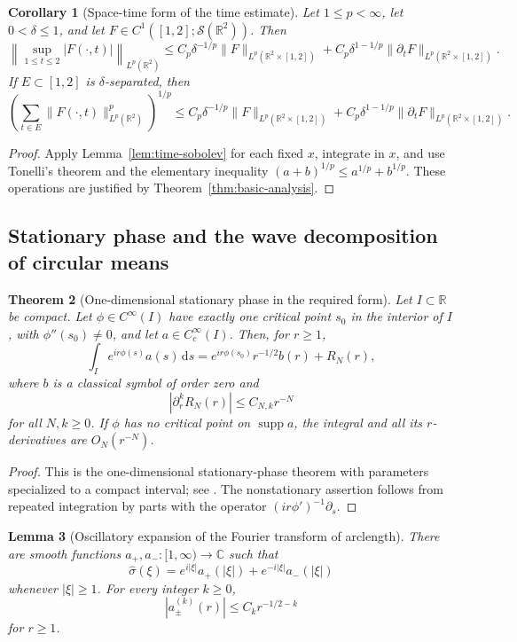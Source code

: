 \documentclass[11pt]{article}
\numberwithin{equation}{section}
\newtheorem{theorem}{Theorem}[section]
\newtheorem{lemma}[theorem]{Lemma}
\newtheorem{corollary}[theorem]{Corollary}
\theoremstyle{definition}
\theoremstyle{remark}
\newcommand{\R}{\mathbb R}
\newcommand{\Sch}{\mathcal S}
\newcommand{\supp}{\operatorname{supp}}
\newcommand{\dd}{\,\mathrm d}
\begin{document}
\begin{corollary}[Space-time form of the time estimate]\label{cor:time-sobolev-spacetime}
Let $1\le p<\infty$, let $0<\delta\le1$, and let $F\in C^1([1,2];\Sch(\R^2))$.  Then
\[
\left\|\sup_{1\le t\le2}|F(\cdot,t)|\right\|_{L^p(\R^2)}
\le C_p\delta^{-1/p}\|F\|_{L^p(\R^2\times[1,2])}
+C_p\delta^{1-1/p}\|\partial_tF\|_{L^p(\R^2\times[1,2])}.
\]
If $E\subset[1,2]$ is $\delta$-separated, then
\[
\left(\sum_{t\in E}\|F(\cdot,t)\|_{L^p(\R^2)}^p\right)^{1/p}
\le C_p\delta^{-1/p}\|F\|_{L^p(\R^2\times[1,2])}
+C_p\delta^{1-1/p}\|\partial_tF\|_{L^p(\R^2\times[1,2])}.
\]
\end{corollary}

\begin{proof}
Apply Lemma~\ref{lem:time-sobolev} for each fixed $x$, integrate in $x$, and use Tonelli's theorem and the elementary inequality $(a+b)^{1/p}\le a^{1/p}+b^{1/p}$.  These operations are justified by Theorem~\ref{thm:basic-analysis}.
\end{proof}

\subsection{Stationary phase and the wave decomposition of circular means}

\begin{theorem}[One-dimensional stationary phase in the required form]\label{thm:stationary-phase}
Let $I\subset\R$ be compact.  Let $\phi\in C^\infty(I)$ have exactly one critical point $s_0$ in the interior of $I$, with $\phi''(s_0)\ne0$, and let $a\in C_c^\infty(I)$.  Then, for $r\ge1$,
\[
\int_Ie^{ir\phi(s)}a(s)\dd s=e^{ir\phi(s_0)}r^{-1/2}b(r)+R_N(r),
\]
where $b$ is a classical symbol of order zero and
\[
|\partial_r^kR_N(r)|\le C_{N,k}r^{-N}
\]
for all $N,k\ge0$.  If $\phi$ has no critical point on $\supp a$, the integral and all its $r$-derivatives are $O_N(r^{-N})$.
\end{theorem}

\begin{proof}
This is the one-dimensional stationary-phase theorem with parameters specialized to a compact interval; see \cite[Theorem~7.7.5]{Hormander1983}.  The nonstationary assertion follows from repeated integration by parts with the operator $(ir\phi')^{-1}\partial_s$.
\end{proof}

\begin{lemma}[Oscillatory expansion of the Fourier transform of arclength]\label{lem:circle-stationary-phase}
There are smooth functions $a_+,a_-:[1,\infty)\to\mathbb C$ such that
\[
\widehat\sigma(\xi)=e^{i|\xi|}a_+(|\xi|)+e^{-i|\xi|}a_-(|\xi|)
\]
whenever $|\xi|\ge1$.  For every integer $k\ge0$,
\[
|a_\pm^{(k)}(r)|\le C_kr^{-1/2-k}
\]
for $r\ge1$.
\end{lemma}
\end{document}
